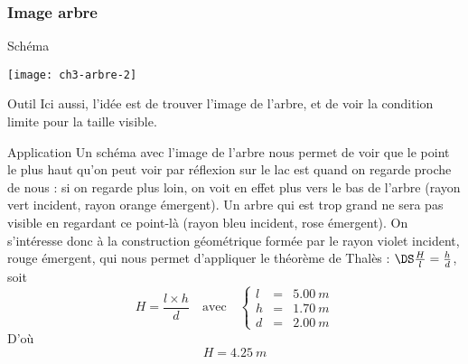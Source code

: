 \documentclass[../main/main.tex]{subfiles}
\begin{document}
\subsubsection{Image arbre}
\begin{tcbraster}[raster columns=2, raster equal height=rows]
    \begin{NCdefi}{Schéma}
        \begin{center}
            \texttt{[image: ch3-arbre-2]}
        \end{center}
    \end{NCdefi}
    \begin{tcolorbox}[blankest, raster multicolumn=1, space to=\myspace]
        \begin{tcbraster}[raster columns=1]
            \begin{NCrapp}[add to natural height=\myspace]{Outil}
                Ici aussi, l'idée est de trouver l'image de l'arbre, et de voir
                la condition limite pour la taille visible.
            \end{NCrapp}
            \begin{NCexem}{Application}
                Un schéma avec l'image de l'arbre nous permet de voir que le
                point le plus haut qu'on peut voir par réflexion sur le lac est
                quand on regarde proche de nous : si on regarde plus loin, on
                voit en effet plus vers le bas de l'arbre (rayon vert incident,
                rayon orange émergent). Un arbre qui est trop grand ne sera pas
                visible en regardant ce point-là (rayon bleu incident, rose
                émergent). On s'intéresse donc à la construction géométrique
                formée par le rayon violet incident, rouge émergent, qui nous
                permet d'appliquer le théorème de Thalès : $\DS\frac{H}{l} =
                \frac{h}{d}$, soit
                \[\boxed{H = \frac{l\times h}{d}} \quad \text{avec} \quad
                    \left\{
                        \begin{array}{rcl}
                            l & = & \SI{5.00}{m}\\
                            h & = & \SI{1.70}{m}\\
                            d & = & \SI{2.00}{m}
                        \end{array}
                \right.\]
                D'où
                \[\boxed{H = \SI{4.25}{m}}\]
            \end{NCexem}
        \end{tcbraster}
    \end{tcolorbox}
\end{tcbraster}

\end{document}

